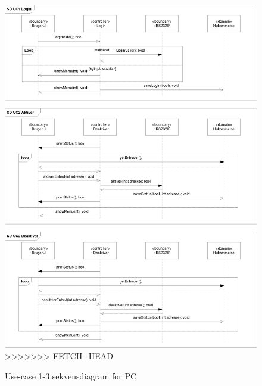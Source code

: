 \begin{figure}[!htb]
     \includegraphics{billeder/uml/PC_SD1}
>>>>>>> FETCH_HEAD
     \caption{Use-case 1-3 sekvensdiagram for PC}
     \label{fig:PC_SD1}
\end{figure}

